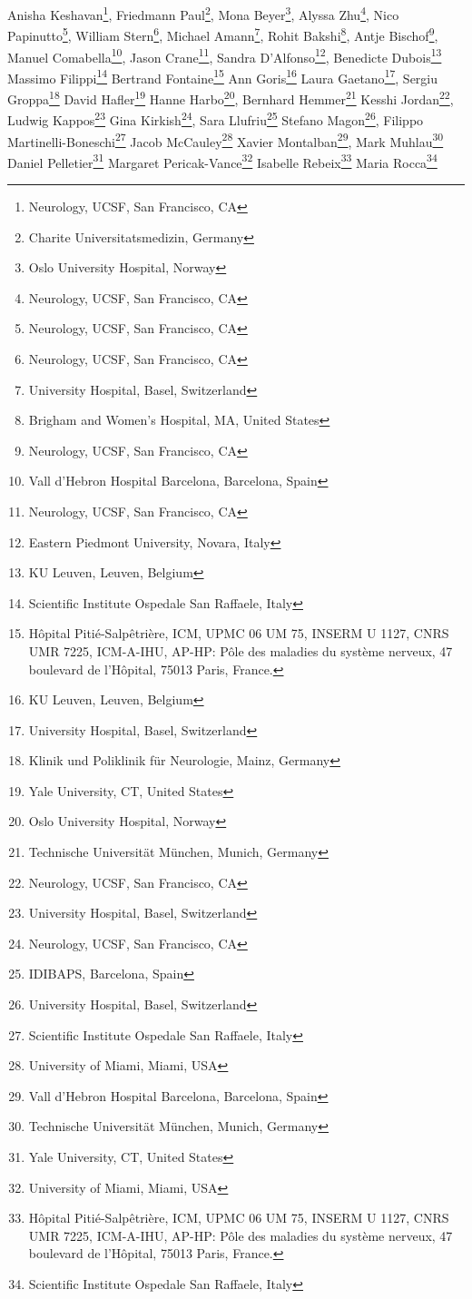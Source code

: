 \iflatexml
Anisha Keshavan\footnote[1]{Neurology, UCSF, San Francisco, CA},
Friedmann Paul\footnote[2]{Charite Universitatsmedizin, Germany},
Mona Beyer\footnote[3]{Oslo University Hospital, Norway},
Alyssa Zhu\footnote[1]{Neurology, UCSF, San Francisco, CA},
Nico Papinutto\footnote[1]{Neurology, UCSF, San Francisco, CA},
William Stern\footnote[1]{Neurology, UCSF, San Francisco, CA},
Michael Amann\footnote[13]{University Hospital, Basel, Switzerland},
Rohit Bakshi\footnote[4]{Brigham and Women's Hospital, MA, United States},
Antje Bischof\footnote[1]{Neurology, UCSF, San Francisco, CA},
Manuel Comabella\footnote[5]{Vall d’Hebron Hospital Barcelona, Barcelona, Spain},
Jason Crane\footnote[1]{Neurology, UCSF, San Francisco, CA},
Sandra D’Alfonso\footnote[6]{Eastern Piedmont University, Novara, Italy},
Benedicte Dubois\footnote[7]{KU Leuven, Leuven, Belgium}
Massimo Filippi\footnote[8]{Scientific Institute Ospedale San Raffaele, Italy}
Bertrand Fontaine\footnote[9]{Hôpital Pitié-Salpêtrière, ICM, UPMC 06 UM 75, INSERM U 1127, CNRS UMR 7225, ICM-A-IHU, AP-HP:  
Pôle des maladies du système nerveux, 47 boulevard de l'Hôpital, 75013  
Paris, France.}
Ann Goris\footnote[7]{KU Leuven, Leuven, Belgium}
Laura Gaetano\footnote[13]{University Hospital, Basel, Switzerland},
Sergiu Groppa\footnote[10]{Klinik und Poliklinik für Neurologie, Mainz, Germany}
David Hafler\footnote[11]{Yale University, CT, United States}
Hanne Harbo\footnote[3]{Oslo University Hospital, Norway},
Bernhard Hemmer\footnote[12]{Technische Universität München, Munich, Germany}
Kesshi Jordan\footnote[1]{Neurology, UCSF, San Francisco, CA},
Ludwig Kappos\footnote[13]{University Hospital, Basel, Switzerland}
Gina Kirkish\footnote[1]{Neurology, UCSF, San Francisco, CA},
Sara Llufriu\footnote[14]{IDIBAPS, Barcelona, Spain}
Stefano Magon\footnote[13]{University Hospital, Basel, Switzerland},
Filippo Martinelli-Boneschi\footnote[8]{Scientific Institute Ospedale San Raffaele, Italy}
Jacob McCauley\footnote[15]{University of Miami, Miami, USA}
Xavier Montalban\footnote[5]{Vall d’Hebron Hospital Barcelona, Barcelona, Spain},
Mark Muhlau\footnote[12]{Technische Universität München, Munich, Germany}
Daniel Pelletier\footnote[11]{Yale University, CT, United States}
Margaret Pericak-Vance\footnote[15]{University of Miami, Miami, USA}
Isabelle Rebeix\footnote[9]{Hôpital Pitié-Salpêtrière, ICM, UPMC 06 UM 75, INSERM U 1127, CNRS UMR 7225, ICM-A-IHU, AP-HP:  
Pôle des maladies du système nerveux, 47 boulevard de l'Hôpital, 75013  
Paris, France.}
Maria Rocca\footnote[8]{Scientific Institute Ospedale San Raffaele, Italy}

